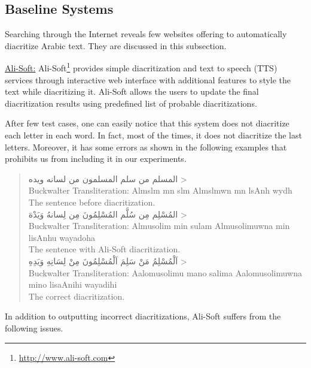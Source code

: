 \documentclass[conference]{IEEEtran}
\newcommand{\softpara}[1]{\smallskip \noindent \underline{#1}}
\begin{document}
\subsection{Baseline Systems}
\label{sec:tools}

Searching through the Internet reveals few websites offering to automatically diacritize Arabic text. They are discussed in this subsection.

\softpara{Ali-Soft:}
Ali-Soft\footnote{\url{http://www.ali-soft.com}} provides simple diacritization and text to speech (TTS) services through interactive web interface with additional features to style the text while diacritizing it.
Ali-Soft allows the users to update the final diacritization results using predefined list of probable diacritizations.

After few test cases, one can easily notice that this system does not diacritize each letter in each word. In fact, most of the times, it does not diacritize the last letters. Moreover, it has some errors as shown in the following examples that prohibits us from including it in our experiments.
\begin{quote}
\centering
\<
المسلم من سلم المسلمون من لسانه ويده
> \\
Buckwalter Transliteration: Almslm mn slm Almslmwn mn lsAnh wydh \\
The sentence before diacritization. \\
\<
المُسْلِم مِن سُلَّم المُسْلِمُونَ مِن لِسانهُ وَيَدْهَ
> \\
Buckwalter Transliteration: Almusolim min sulam Almusolimuwna min lisAnhu wayadoha \\
The sentence with Ali-Soft diacritization. \\
\<
اَلْمُسْلِمُ مَنْ سَلِمَ اَلْمُسْلِمُونَ مِنْ لِسَانِهِ وَيَدِهِ
> \\
Buckwalter Transliteration: Aalomusolimu mano salima Aalomusolimuwna mino lisaAnihi wayadihi \\
The correct diacritization. \\
\end{quote}
In addition to outputting incorrect diacritizations, Ali-Soft suffers from the following issues.
\end{document}
